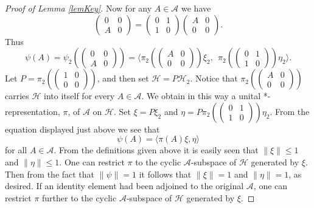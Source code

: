 \documentclass[12pt]{amsart}
\newcommand{\<}{\langle}
\renewcommand{\>}{\rangle}
\newcommand{\cA}{{\mathcal A}}
\newcommand{\cH}{{\mathcal H}}
\theoremstyle{definition}   %
\begin{document}
\begin{proof}[Proof of Lemma \ref{lemKey}]
Now for any $A \in \cA$ we have
\[
\begin{pmatrix}  0 & 0 \\
                          A & 0       \end{pmatrix}    
=
\begin{pmatrix}  0 & 1 \\
                          1 & 0       \end{pmatrix}    
                                          \begin{pmatrix}  A & 0 \\
                                          0 & 0       \end{pmatrix}    .                                                    
\]
Thus
\[
\psi(A) = \psi_2\left( \begin{pmatrix}  0 & 0 \\
                                                          A & 0       \end{pmatrix} \right) 
= \<\pi_2 \left( \begin{pmatrix}  A & 0 \\
                                          0 & 0       \end{pmatrix}    \right) \xi_2, \ \
\pi_2 \left( \begin{pmatrix}  0 & 1 \\
                                          1 & 0       \end{pmatrix}    \right) \eta_2 \>  . 
\]
Let $P = \pi_2(
(\begin{smallmatrix}  1 & 0 \\ 0 & 0 \end{smallmatrix} ) ) $,
and then set $\cH = P\cH_2$. Notice that $\pi_2(
(\begin{smallmatrix}  A & 0 \\ 0 & 0 \end{smallmatrix} ) ) $ carries
$\cH$ into itself for every $A \in \cA$. We obtain in this way a unital
*-representation, $\pi$, of $\cA$ on $\cH$. Set $\xi = P\xi_2$ and $\eta =
P\pi_2( (\begin{smallmatrix}  0 & 1 \\ 1 & 0 \end{smallmatrix} ) )\eta_2 . $
From the equation displayed just above we see that
\[
\psi(A) = \<\pi(A)\xi, \eta\>
\]
for all $A \in \cA$. From the definitions given above it is easily
seen that $\|\xi\| \leq 1$ and $\|\eta\| \leq 1$. 
One can restrict $\pi$ to the cyclic
$\cA$-subspace of $\cH$ generated by $\xi$. Then from the fact
that $\|\psi\| = 1$ it follows that $\|\xi\| = 1$ and $\|\eta\| = 1$,
as desired. If an identity element had been adjoined to the 
original $\cA$, one can restrict $\pi$ further to the cyclic
$\cA$-subspace of $\cH$ generated by $\xi$.
\end{proof}
\end{document}
